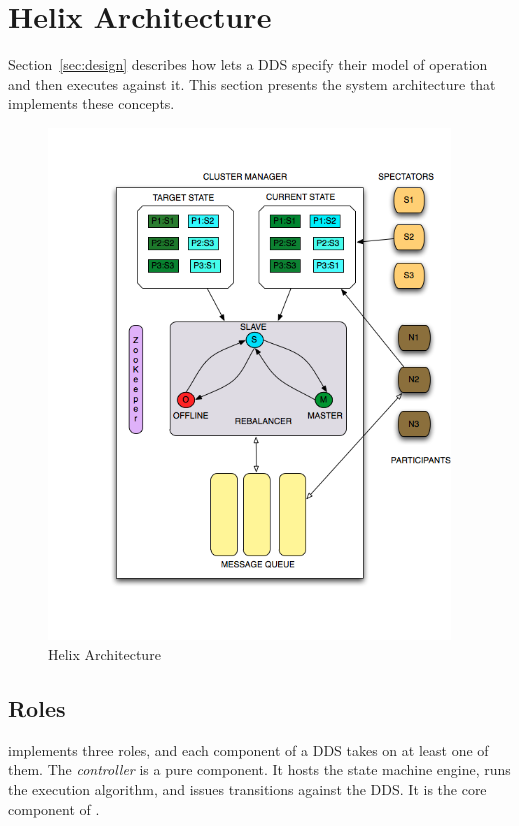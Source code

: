 \section{Helix Architecture}
\label{sec:arch}
%

Section~\ref{sec:design} describes how \helix lets a DDS specify their model of
operation and then executes against it.  This section presents the \helix system
architecture that implements these concepts.

\begin{figure}
\begin{minipage}[t]{0.48\textwidth}
\includegraphics[width=0.95\textwidth]{Helix.png}
\vspace*{-4ex}
\caption{Helix Architecture}
\label{fig:arch}
\end{minipage}
\end{figure}

\subsection{\helix Roles}
\label{sec:roles}
%
\helix implements three roles, and each component of a DDS takes on at least one of them.
The \emph{controller} is a pure \helix component.  It hosts the state machine engine, 
runs the execution algorithm, and issues transitions against the DDS.  It is the
core component of \helix.

